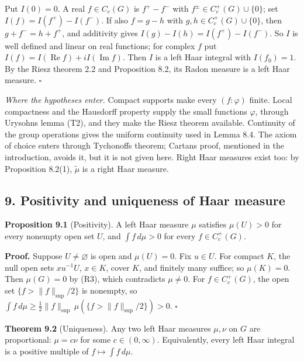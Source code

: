 \documentclass[
  english,
  11pt,
  a4paper,
]{article}
\newcounter{none} %
\begin{document}
Put \(I(0)=0\). A real \(f\in C_c(G)\) is \(f^+-f^-\) with
\(f^\pm\in C_c^+(G)\cup\{0\}\); set \(I(f)=I(f^+)-I(f^-)\). If also
\(f=g-h\) with \(g,h\in C_c^+(G)\cup\{0\}\), then \(g+f^-=h+f^+\), and
additivity gives \(I(g)-I(h)=I(f^+)-I(f^-)\). So \(I\) is well defined
and linear on real functions; for complex \(f\) put
\(I(f)=I(\operatorname{Re}f)+iI(\operatorname{Im}f)\). Then \(I\) is a
left Haar integral with \(I(f_0)=1\). By the Riesz theorem 2.2 and
Proposition 8.2, its Radon measure is a left Haar measure. \(\square\)

\emph{Where the hypotheses enter.} Compact supports make every
\((f:\varphi)\) finite. Local compactness and the Hausdorff property
supply the small functions \(\varphi\), through
Urysohn\textquotesingle s lemma (T2), and they make the Riesz theorem
available. Continuity of the group operations gives the uniform
continuity used in Lemma 8.4. The axiom of choice enters through
Tychonoff\textquotesingle s theorem; Cartan\textquotesingle s proof,
mentioned in the introduction, avoids it, but it is not given here.
Right Haar measures exist too: by Proposition 8.2(1), \(\tilde\mu\) is a
right Haar measure.

\subsection[9. Positivity and uniqueness of Haar
measure]{\texorpdfstring{\protect\hypertarget{haar-measure-on-locally-compact-groups--oa-fnd-hm-06}{}{}9.
Positivity and uniqueness of Haar
measure}{9. Positivity and uniqueness of Haar measure}}\label{haar-measure-on-locally-compact-groups--OA-FND-HM-06}

\textbf{Proposition 9.1} (Positivity). A left Haar measure \(\mu\)
satisfies \(\mu(U)>0\) for every nonempty open set \(U\), and
\(\int f\,d\mu>0\) for every \(f\in C_c^+(G)\).

\textbf{Proof.} Suppose \(U\neq\varnothing\) is open and \(\mu(U)=0\).
Fix \(u\in U\). For compact \(K\), the null open sets \(xu^{-1}U\),
\(x\in K\), cover \(K\), and finitely many suffice; so \(\mu(K)=0\).
Then \(\mu(G)=0\) by (R3), which contradicts \(\mu\neq0\). For
\(f\in C_c^+(G)\), the open set \(\{f>\|f\|_{\sup}/2\}\) is nonempty, so
\(\int f\,d\mu\geq\frac12\|f\|_{\sup}\,\mu(\{f>\|f\|_{\sup}/2\})>0\).
\(\square\)

\textbf{Theorem 9.2} (Uniqueness). Any two left Haar measures
\(\mu,\nu\) on \(G\) are proportional: \(\mu=c\nu\) for some
\(c\in(0,\infty)\). Equivalently, every left Haar integral is a positive
multiple of \(f\mapsto\int f\,d\mu\).
\end{document}

